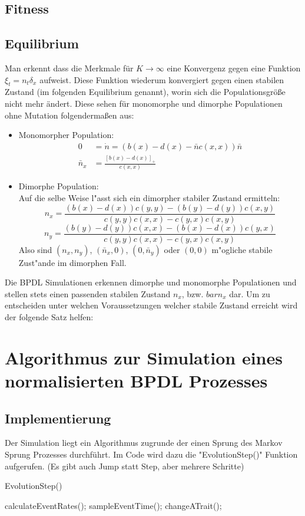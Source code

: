 \documentclass[11pt, a4paper, german]{article}
\begin{document}
	\subsection{Fitness}
	
	\subsection{Equilibrium}
	Man erkennt dass die Merkmale für $ K \to \infty $ eine Konvergenz gegen eine Funktion $ \xi_t = n_t \delta_x $ aufweist. Diese Funktion wiederum konvergiert gegen einen stabilen Zustand (im folgenden Equilibrium genannt), worin sich die Populationsgröße nicht mehr ändert. Diese sehen für monomorphe und dimorphe Populationen ohne Mutation folgendermaßen aus:
	\begin{itemize}
		\item Monomorpher Population:\\
			\begin{align*}
			0 & = \dot{n} = (b(x) - d(x) - \bar{n}c(x,x))\bar{n}\\
			\bar{n}_x &= \frac{\left[ b(x)-d(x) \right]_+}{c(x,x)}
			\end{align*}
		\item Dimorphe Population:\\
			Auf die selbe Weise l"asst sich ein dimorpher stabiler Zustand ermitteln:
			\[ n_x = \frac{(b(x) - d(x))c(y,y)-(b(y)-d(y))c(x,y)}{c(y,y)c(x,x) - c(y,x)c(x,y)} \]
			\[ n_y = \frac{(b(y) - d(y))c(x,x)-(b(x)-d(x))c(y,x)}{c(y,y)c(x,x) - c(y,x)c(x,y)} \]
			Also sind $ (n_x, n_y) $, $ (\bar{n}_x, 0)$, $ (0, \bar{n}_y)$ oder $ (0,0) $ m"ogliche stabile Zust"ande im dimorphen Fall.
	\end{itemize}
	Die BPDL Simulationen erkennen dimorphe und monomorphe Populationen und stellen stets einen passenden stabilen Zustand $ n_x $, bzw. $ bar{n}_x $ dar. Um zu entscheiden unter welchen Voraussetzungen welcher stabile Zustand erreicht wird der folgende Satz helfen:


\clearpage
\section{Algorithmus zur Simulation eines normalisierten BPDL Prozesses}
	\subsection{Implementierung}
	Der Simulation liegt ein Algorithmus zugrunde der einen Sprung des Markov Sprung Prozesses durchführt. Im Code wird dazu die "{}EvolutionStep()"{} Funktion aufgerufen. (Es gibt auch Jump statt Step, aber mehrere Schritte)
	\begin{algorithm}[H]
		\caption{EvolutionStep()}
		\begin{algorithmic}[1]
			\STATE calculateEventRates();
			\STATE sampleEventTime();
			\STATE changeATrait();
		\end{algorithmic}
	\end{algorithm}
	
\end{document}
